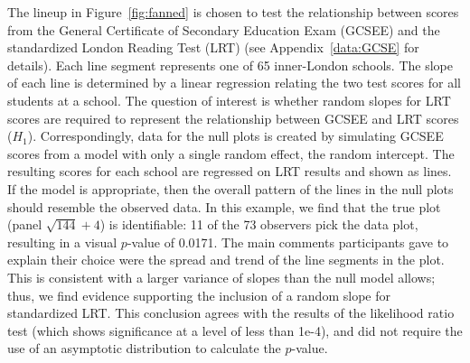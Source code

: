 \documentclass[12pt]{article} %
\newcommand{\hh}[1]{{\color{orange} #1}}
\newcommand{\al}[1]{{\color{ForestGreen} #1}}
\newcommand{\alnote}[1]{\todo[inline,color=green!40]{#1}} %
\begin{document}
The lineup in Figure~\ref{fig:fanned} is chosen to test the relationship between scores from the General Certificate of Secondary Education Exam (GCSEE) and the  standardized London Reading Test (LRT) (see Appendix~\ref{data:GCSE} for details).  Each line segment represents one of 65 inner-London schools. The slope of each line is determined by a linear regression relating the two test scores for all students at a school. 
The question of interest is whether random slopes for LRT scores are required to  represent the relationship between GCSEE and LRT scores ($H_1$). Correspondingly, data for the null plots  is  created by simulating GCSEE scores from a model with only a single random effect, the random intercept.
The resulting scores for each school are regressed on LRT results and shown as lines.
 If the model is appropriate, then the overall pattern of the lines in the null plots should resemble the observed data. In this example, we find that the true plot (panel $\sqrt{144} + 4$) is identifiable:  11 of the 73 observers pick the data plot, resulting in a visual $p$-value of 0.0171. The main comments participants gave to explain their choice were the spread and trend of the line segments in the plot. This is consistent with a larger variance of slopes than the null model allows;
  thus, we find evidence supporting the inclusion of a random slope for standardized LRT. This conclusion agrees with the results of the likelihood ratio test (which shows significance at a level of less than 1e-4), and did not require the use of an asymptotic distribution to calculate the $p$-value. 
  
\end{document}
